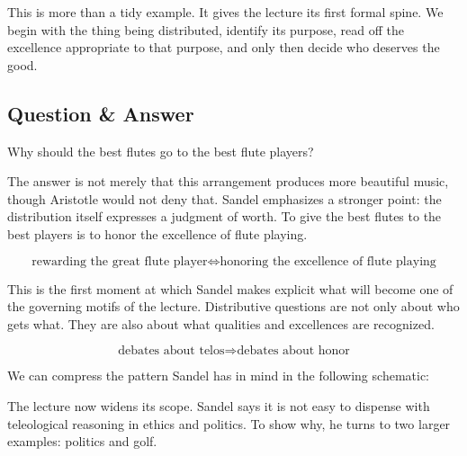 This is more than a tidy example. It gives the lecture its first formal spine. We begin with the thing being distributed, identify its purpose, read off the excellence appropriate to that purpose, and only then decide who deserves the good.

\subsection{Question \& Answer}

Why should the best flutes go to the best flute players?

The answer is not merely that this arrangement produces more beautiful music, though Aristotle would not deny that. Sandel emphasizes a stronger point: the distribution itself expresses a judgment of worth. To give the best flutes to the best players is to honor the excellence of flute playing.

\begin{equation}
\text{rewarding the great flute player}
\Longleftrightarrow
\text{honoring the excellence of flute playing}
\end{equation}

This is the first moment at which Sandel makes explicit what will become one of the governing motifs of the lecture. Distributive questions are not only about who gets what. They are also about what qualities and excellences are recognized.

\begin{equation}
\text{debates about telos}
\Longrightarrow
\text{debates about honor}
\end{equation}

We can compress the pattern Sandel has in mind in the following schematic:

\begin{figure}
\centering
{}
\end{figure}

The lecture now widens its scope. Sandel says it is not easy to dispense with teleological reasoning in ethics and politics. To show why, he turns to two larger examples: politics and golf.

